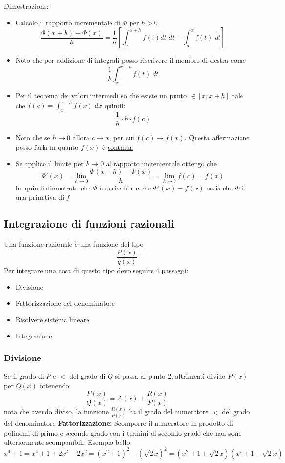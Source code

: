 Dimostrazione:
\begin{itemize}
	\item Calcolo il rapporto incrementale di $  \Phi  $ per $ h > 0  $
	      \[
		      \frac{\Phi \left( x+h \right) - \Phi \left( x \right) }{h}= \frac{1}{h}\left[ \int_{x}^{x+h} f\left( t \right) dt \; dt - \int_{a}^{x} f\left( t \right)  \; dt \right]
	      \]
	\item Noto che per addizione di integrali posso riscrivere il membro di destra come
	      \[
		      \frac{1}{h} \int_{x}^{x+h} f(t) \; dt
	      \]
	\item Per il teorema dei valori intermedi so che esiste un punto $ \in \left[ x, x+h \right]  $ tale che $  f\left( c \right) = \int_{x}^{x+h} f\left( x \right)  \; dx$ quindi:
	      \[
		      \frac{1}{h} \cdot h \cdot f\left( c \right)
	      \]
	\item Noto che se $ h \to 0 $ allora $  c \to x $, per cui $ f\left( c \right) \to f\left( x \right)  $. Questa affermazione posso farla in quanto $  f\left( x \right)  $ è \underline{continua}
	\item Se applico il limite per $ h \to 0 $ al rapporto incrementale ottengo che
	      \[
		      \Phi '\left( x \right) = \lim_{h \to 0} \frac{\Phi \left( x+h \right) -\Phi \left( x \right) }{h} = \lim_{h \to 0} f\left( c \right) = f\left( x \right)
	      \]
	      ho quindi dimostrato che $ \Phi  $ è derivabile e che $ \Phi '\left( x \right)  = f\left( x \right) $ ossia che $ \Phi  $ è una primitiva di $ f $
\end{itemize}
\subsection{Integrazione di funzioni razionali}
Una funzione razionale è una funzione del tipo
\[
	\frac{P\left( x \right) }{q\left( x \right) }
\]
Per integrare una cosa di questo tipo devo seguire 4 passaggi:
\begin{itemize}
	\item Divisione
	\item Fattorizzazione del denominatore
	\item Risolvere sistema lineare
	\item Integrazione
\end{itemize}
\subsubsection*{Divisione} Se il grado di $ P $ è $ < $ del grado di $ Q $ si passa al punto 2, altrimenti divido $ P\left( x \right)  $ per $  Q\left( x \right)  $ ottenendo:
\[
	\frac{P\left( x \right) }{Q\left( x \right) }= A\left( x \right) + \frac{R\left( x \right) }{P\left( x \right) }
\]
nota che avendo diviso, la funzione $ \frac{R\left( x \right)}{P\left( x \right) }  $ ha il grado del numeratore $ < $ del grado del denominatore
\vskip3mm
\textbf{Fattorizzazione:} Scomporre il numeratore in prodotto di polinomi di primo e secondo grado con i termini di secondo grado che non sono ulteriormente scomponibili. Esempio bello:
\[
	x^{4} + 1 = x^{4} + 1 + 2x^2 - 2x^2= \left( x^2 + 1 \right)^{2}- \left( \sqrt{2} x \right) ^2 = \left( x^2 + 1 + \sqrt{2} x \right) \left( x^2 + 1 - \sqrt{2} x \right)
\]

